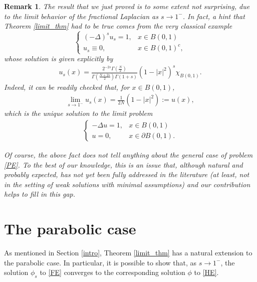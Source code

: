 \documentclass[reqno,twoside]{amsart}
\newtheorem{remark}[theorem]{Remark}
\numberwithin{equation}{section}
\newcommand{\fl}[2]{(-\Delta)^#1#2}
\begin{document}
\begin{remark}
The result that we just proved is to some extent not surprising, due to the limit behavior of the fractional Laplacian as $s\to 1^-$. In fact, a hint that Theorem \ref{limit_thm} had to be true comes from the very classical example
\begin{equation*}
	\begin{cases}
		\fl{s}{u_s} =1, &x\in B(0,1)
		\\
		u_s\equiv 0, & x\in B(0,1)^c,
	\end{cases}
\end{equation*}
whose solution is given explicitly by
\begin{align*}
	u_s(x) = \frac{2^{-2s}\Gamma\left(\frac N2\right)}{\Gamma\left(\frac{N+2s}{2}\right)\Gamma(1+s)}\left(1-|x|^2\right)^s\chi_{B(0,1)}.
\end{align*}
Indeed, it can be readily checked that, for $x\in B(0,1)$, 
\begin{align*}
	\lim_{s\to 1^-} u_s(x) = \frac{1}{2N}\left(1-|x|^2\right):=u(x),
\end{align*}
which is the unique solution to the limit problem 
\begin{align*}
	\begin{cases}
		-\Delta u =1 , &x\in B(0,1)
		\\
		u= 0, & x\in \partial B(0,1).
	\end{cases}
\end{align*}

Of course, the above fact does not tell anything about the general case of problem \eqref{PE}. To the best of our knowledge, this is an issue that, although natural and probably expected, has not yet been fully addressed in the literature (at least, not in the setting of weak solutions with minimal assumptions) and our contribution helps to fill in this gap. 

\end{remark}

\section{The parabolic case}\label{parabolic_sec}

As mentioned in Section \ref{intro}, Theorem \ref{limit_thm} has a natural extension to the parabolic case. In particular, it is possible to show that, as $s\to 1^-$, the solution $\phi_s$ to \eqref{FE} converges to the corresponding solution $\phi$ to \eqref{HE}. 
\end{document}

